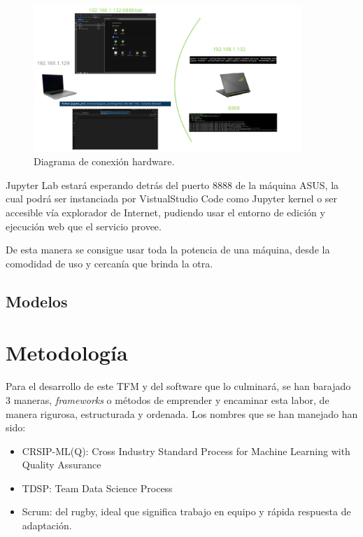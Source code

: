\begin{figure}[H]
\centering
\includegraphics[width=0.9\textwidth]{images/jupyter-diagram.png}
\caption{Diagrama de conexión hardware.}
\label{fig:jupyter-diagram}
\end{figure}

Jupyter Lab estará esperando detrás del puerto 8888 de la máquina ASUS, la cual podrá ser instanciada por VistualStudio Code como Jupyter kernel o ser accesible vía explorador de Internet, pudiendo usar el entorno de edición y ejecución web que el servicio provee.

De esta manera se consigue usar toda la potencia de una máquina, desde la comodidad de uso y cercanía que brinda la otra.

\subsection{Modelos}



\section{Metodología}

Para el desarrollo de este TFM y del software que lo culminará, se han barajado 3 maneras, \emph{frameworks} o métodos de emprender y encaminar esta labor, de manera rigurosa, estructurada y ordenada. Los nombres que se han manejado han sido:
\begin{itemize}
    \item CRSIP-ML(Q): Cross Industry Standard Process for Machine Learning with Quality Assurance
    \item TDSP: Team Data Science Process
    \item Scrum: del rugby, ideal que significa trabajo en equipo y rápida respuesta de adaptación.
\end{itemize}

